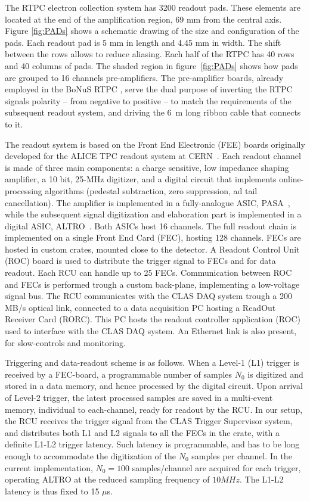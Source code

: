 \documentclass[twocolumn,showpacs,superscriptaddress,groupedaddress]{revtex4}
\begin{document}
The RTPC electron collection system has 3200 readout pads. These elements are
located at the end of the amplification region, 69 mm from the central axis.
Figure \ref{fig:PADs} shows a schematic drawing of the size and 
configuration of the pads. Each readout pad is 5 mm in length and 4.45 mm in 
width.  The shift between the rows allows to reduce aliasing. Each half of the 
RTPC has 40 rows and 40 columns of pads. The shaded region in figure~\ref{fig:PADs} 
shows how pads are grouped to 16 channels pre-amplifiers. The pre-amplifier boards, 
already employed in the BoNuS RTPC \cite{BONUS-NIM}, serve the dual purpose of 
inverting the RTPC signals polarity -- from negative to positive -- to match the 
requirements of the subsequent readout system, and driving the 6~m long ribbon 
cable that connects to it.

The readout system is based on the Front End Electronic (FEE) boards originally 
developed for the ALICE TPC readout system at CERN~\cite{ALICE-FEE}. Each 
readout channel is made of three main components: a charge sensitive, low 
impedance shaping amplifier, a 10 bit, 25-MHz digitizer, and a digital circuit 
that implements online-processing algorithms (pedestal subtraction, zero 
suppression, ad tail cancellation). The amplifier is implemented in a 
fully-analogue ASIC, PASA~\cite{ALICE-PASA}, while the subsequent signal 
digitization and elaboration part is implemented in a digital ASIC, 
ALTRO~\cite{ALICE-ALTRO}. Both ASICs host 16 channels. The full readout 
chain is implemented on a single Front End Card (FEC), hosting 128 channels. 
FECs are hosted in custom crates, mounted close to the detector. A Readout 
Control Unit (ROC) board is used to distribute the trigger signal to FECs 
and for data readout. Each RCU can handle up to 25 FECs. Communication 
between ROC and FECs is performed trough a custom back-plane, implementing 
a low-voltage signal bus. The RCU communicates with the CLAS DAQ system 
trough a 200 MB/s optical link, connected to a data acquisition PC hosting 
a ReadOut Receiver Card (RORC). This PC hosts the readout controller 
application (ROC) used to interface with the CLAS DAQ system. An Ethernet 
link is also present, for slow-controls and monitoring.

Triggering and data-readout scheme is as follows. When a Level-1 (L1) trigger 
is received by a FEC-board, a programmable number of samples $N_0$ is digitized 
and stored in a data memory, and hence processed by the digital circuit. Upon 
arrival of Level-2 trigger, the latest processed samples are saved in a 
multi-event memory, individual to each-channel, ready for readout by the RCU.  
In our setup, the RCU receives the trigger signal from the CLAS Trigger 
Supervisor system, and distributes both L1 and L2 signals to all the FECs in 
the crate, with a definite L1-L2 trigger latency. Such latency is programmable, 
and has to be long enough to accommodate the digitization of the $N_0$ samples 
per channel.  In the current implementation, $N_0=100$ samples/channel are 
acquired for each trigger, operating ALTRO at the reduced sampling frequency of 
$10 MHz$. The L1-L2 latency is thus fixed to 15 $\mu$s.
\end{document}
